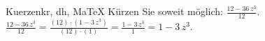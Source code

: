 \begin{MAufgabe}{Kuerzen}{kr, dh, MaTeX}
K\"urzen Sie soweit m\"oglich: $\frac{12 - 36\, z^3}{12}$.\\ 
\ifLsg\MLoesung
\quad $\frac{12 - 36\, z^3}{12}=\frac{(12)\cdot(1 - 3\, z^3)}{(12)\cdot(1)}=\frac{1 - 3\, z^3}{1}=1 - 3\, z^3$.\else\relax\fi
 \end{MAufgabe}